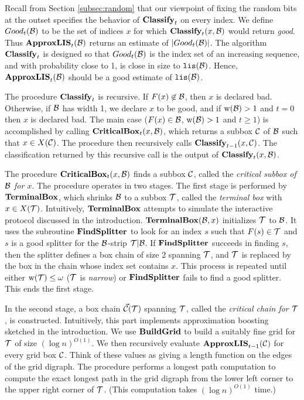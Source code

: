 \documentclass{acmsmall}
\newcommand{\cB}{{\cal B}}
\newcommand{\cC}{{\cal C}}
\newcommand{\cT}{{\cal T}}
\newcommand{\lis}{{\tt lis}}
\newcommand{\terminalbox}{{\rm{\bf TerminalBox}}}
\newcommand{\strip}[2]{#1|#2}
\newcommand{\width}{{\bf {\rm  w}}}
\newcommand{\classify}{{\rm {\bf Classify}}}
\newcommand{\approxlis}{{\rm {\bf ApproxLIS}}}
\newcommand{\critbox}{{\rm {\bf CriticalBox}}}
\newcommand{\findsplitter}{{\rm {\bf FindSplitter}}}
\newcommand{\buildgrid}{{\rm {\bf BuildGrid}}}
\newcommand{\lischain}{{\rm {\bf LIS.Chain}}}
\begin{document}
Recall from Section \ref{subsec:random} 
that 
our viewpoint of fixing the random bits at the outset specifies the behavior of $\classify_t$ on every index.
We define $Good_t(\cB)$ to be the set of indices $x$ for which $\classify_t(x,\cB)$ would return {\em good}.
Thus $\approxlis_t(\cB)$ returns an estimate of $|Good_t(\cB)|$.  
The algorithm $\classify_t$ is designed so that $Good_t(\cB)$ is the index set of an increasing sequence,
and with probability close to 1, is close in size to $\lis(\cB)$.  Hence, $\approxlis_t(\cB)$
should be a good estimate of $\lis(\cB)$. 

The procedure $\classify_t$ is recursive.  If $F(x) \not\in \cB$, then $x$ is declared bad.  
Otherwise, if $\cB$ has width 1, we declare $x$ to be good,
and if $\width(\cB)>1$  and $t=0$ then $x$ is declared bad.
The main case ($F(x) \in \cB$, $\width(\cB) >1$ and $t \geq 1$) is accomplished by
calling
$\critbox_t(x,\cB)$, which returns a subbox $\cC$ of $\cB$
such that $x \in X(\cC)$. The procedure then recursively calls
$\classify_{t-1}(x,\cC)$.  The classification returned by this recursive call is the output
of $\classify_t(x,\cB)$.  

The procedure $\critbox_t(x,\cB)$  finds a subbox $\cC$, called the {\em critical subbox of $\cB$ for $x$}.
The procedure operates in two stages.
The first stage  is performed by $\terminalbox$,
which shrinks $\cB$ to a subbox $\cT$, called the {\em terminal box} with $x \in X(\cT)$.
Intuitively, $\terminalbox$  attempts to simulate the interactive protocol discussed in the introduction.
$\terminalbox(\cB,x)$ initializes $\cT$ to $\cB$.  It  uses the subroutine $\findsplitter{}$ 
to look for an index $s$ such that $F(s) \in \cT$
and $s$ is a good splitter for the $\cB$-strip $\strip{\cT}{\cB}$. 
If $\findsplitter$ succeeds
in finding $s$, then the splitter defines a box chain of size
2 spanning $\cT$, and $\cT$ is replaced by the box in the chain whose index set contains $x$.  This process is repeated 
until either $\width(\cT) \leq \omega$ ($\cT$ is {\em narrow}) or $\findsplitter$ fails to find a good splitter.
This ends the first stage.


In the second stage,  a box chain $\vec{\cC}(\cT)$ spanning $\cT$, called the {\em critical chain for $\cT$}, is constructed.
Intuitively, this part implements approximation boosting sketched in the introduction.
We
use $\buildgrid$ to build a suitably
fine grid for $\cT$ of size $(\log n)^{O(1)}$.  
We then recursively
evaluate $\approxlis_{t-1}(\cC)$ 
for every grid box $\cC$.  Think of these values as giving
a length function on the edges of the grid digraph.  The procedure
performs a longest path
computation to compute the exact longest  
path in the grid digraph 
from the lower left corner to the upper right
corner of $\cT$. (This computation takes $(\log n)^{O(1)}$ time.)
\end{document}
